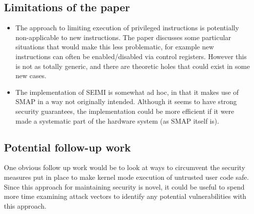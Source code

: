 \documentclass[11pt]{article}
\begin{document}
\subsection*{Limitations of the paper}

\begin{itemize}
\item The approach to limiting execution of privileged instructions is potentially non-applicable to new instructions. The paper discusses some particular situations that would make this less problematic, for example new instructions can often be enabled/disabled via control registers. However this is not as totally generic, and there are theoretic holes that could exist in some new cases.
\item The implementation of SEIMI is somewhat ad hoc, in that it makes use of SMAP in a way not originally intended. Although it seems to have strong security guarantees, the implementation could be more efficient if it were made a systematic part of the hardware system (as SMAP itself is).
\end{itemize}

\subsection*{Potential follow-up work}

One obvious follow up work would be to look at ways to circumvent the security measures put in place to make kernel mode execution of untrusted user code safe. Since this approach for maintaining security is novel, it could be useful to spend more time examining attack vectors to identify any potential vulnerabilities with this approach.
\end{document}
